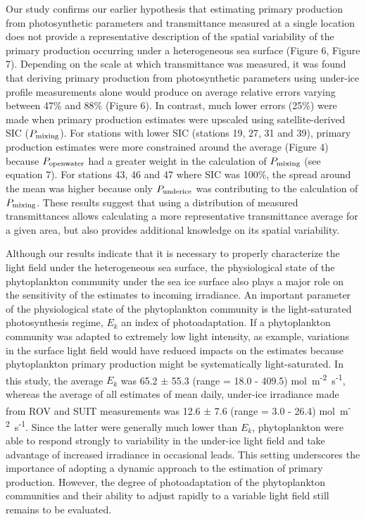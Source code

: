 \documentclass[draft]{agujournal2018}
\newcommand{\ppopenwater}{\ensuremath{P_{\textnormal{\scriptsize openwater}}}}
\newcommand{\ppmixing}{\ensuremath{P_{\textnormal{\scriptsize mixing}}}}
\newcommand{\ppunderice}{\ensuremath{P_{\textnormal{\scriptsize underice}}}}
\newcommand{\micromol}{\textmu mol~m\textsuperscript{-2}~s\textsuperscript{-1}}
\begin{document}
Our study confirms our earlier hypothesis that estimating primary production from photosynthetic parameters and transmittance measured at a single location does not provide a representative description of the spatial variability of the primary production occurring under a heterogeneous sea surface (Figure 6, Figure 7). Depending on the scale at which transmittance was measured, it was found that deriving primary production from photosynthetic parameters using under-ice profile measurements alone would produce on average relative errors varying between 47\% and 88\% (Figure 6). In contrast, much lower errors (25\%) were made when primary production estimates were upscaled using satellite-derived SIC (\ppmixing{}). For stations with lower SIC (stations 19, 27, 31 and 39), primary production estimates were more constrained around the average (Figure 4) because \ppopenwater{} had a greater weight in the calculation of \ppmixing{} (see equation 7). For stations 43, 46 and 47 where SIC was 100\%, the spread around the mean was higher because only \ppunderice{} was contributing to the calculation of \ppmixing{}. These results suggest that using a distribution of measured transmittances allows calculating a more representative transmittance average for a given area, but also provides additional knowledge on its spatial variability.

Although our results indicate that it is necessary to properly characterize the light field under the heterogeneous sea surface, the physiological state of the phytoplankton community under the sea ice surface also plays a major role on the sensitivity of the estimates to incoming irradiance. An important parameter of the physiological state of the phytoplankton community is the light-saturated photosynthesis regime, $E_k$ an index of photoadaptation. If a phytoplankton community was adapted to extremely low light intensity, as example,  variations in the surface light field would have reduced impacts on the estimates because phytoplankton primary production might be systematically light-saturated. In this study, the average $E_k$ was 65.2 $\pm$ 55.3 (range = 18.0 - 409.5) \micromol{}, whereas the average of  all estimates of mean daily, under-ice irradiance made from ROV and SUIT measurements was 12.6 $\pm$ 7.6 (range = 3.0 - 26.4) \micromol{}. Since the latter were generally much lower than $E_k$, phytoplankton were able to respond strongly to variability in the under-ice light field and take advantage of increased irradiance in occasional leads. This setting underscores the importance of adopting a dynamic approach to the estimation of primary production. However, the degree of photoadaptation of the phytoplankton communities and their ability to adjust rapidly to a variable light field still remains to be evaluated.
\end{document}
